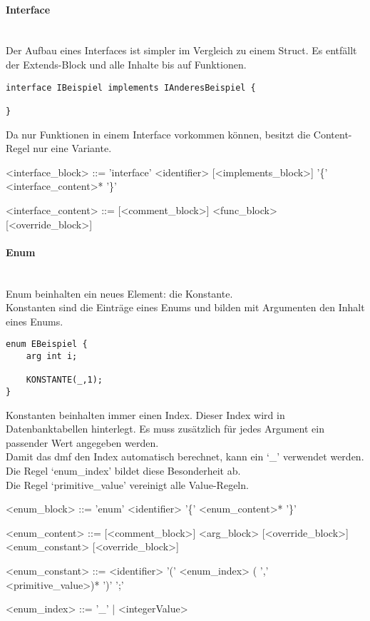 \documentclass[./einleitung.tex]{subfiles}
\begin{document}
\paragraph{Interface}\mbox{}\\
Der Aufbau eines Interfaces ist simpler im Vergleich zu einem Struct.
Es entfällt der Extends-Block und alle Inhalte bis auf Funktionen.
\begin{lstlisting}
interface IBeispiel implements IAnderesBeispiel {

}
\end{lstlisting}
Da nur Funktionen in einem Interface vorkommen können, besitzt die Content-Regel nur eine Variante.
\begin{grammar}
<interface_block> ::= 'interface' <identifier> [<implements_block>] '\{' <interface_content>* '\}'

<interface_content> ::= [<comment_block>] <func_block> [<override_block>]
\end{grammar}

\paragraph{Enum}\mbox{}\\
Enum beinhalten ein neues Element: die Konstante. \\
Konstanten sind die Einträge eines Enums und bilden mit Argumenten den Inhalt eines Enums.
\begin{lstlisting}
enum EBeispiel {
    arg int i;
    
    KONSTANTE(_,1);
}
\end{lstlisting}
Konstanten beinhalten immer einen Index.
Dieser Index wird in Datenbanktabellen hinterlegt.
Es muss zusätzlich für jedes Argument ein passender Wert angegeben werden. \\
Damit das \acrshort{dmf} den Index automatisch berechnet, kann ein `_' verwendet werden.
Die Regel `enum_index' bildet diese Besonderheit ab. \\
Die Regel `primitive_value' vereinigt alle Value-Regeln.
\begin{grammar}
<enum_block> ::= 'enum' <identifier> '\{' <enum_content>* '\}'

<enum_content> ::= [<comment_block>] <arg_block> [<override_block>]
 <enum_constant> [<override_block>]

<enum_constant> ::= <identifier> '(' <enum_index> ( ',' <primitive_value>)* ')' ';'

<enum_index> ::= '_' | <integerValue>
\end{grammar}
\end{document}
